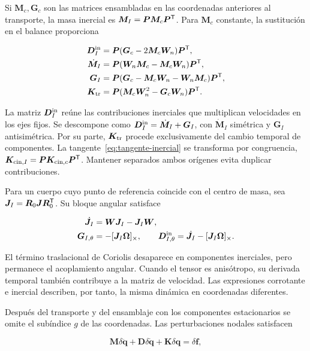 Si $\bm M_c,\bm G_c$ son las matrices ensambladas en las coordenadas anteriores al transporte, la masa inercial es $\bm M_I=\bm P\bm M_c\bm P^\mathsf T$. Para $\bm M_c$ constante, la sustitución en el balance proporciona

\begin{align}
\bm D_I^{\rm in}&=\bm P(\bm G_c-2\bm M_c\bm W_n)\bm P^\mathsf T,\nonumber\\
\dot{\bm M}_I&=\bm P(\bm W_n\bm M_c-\bm M_c\bm W_n)\bm P^\mathsf T,\nonumber\\
\bm G_I&=\bm P(\bm G_c-\bm M_c\bm W_n-\bm W_n\bm M_c)\bm P^\mathsf T,\label{eq:transportG}\\
\bm K_{\rm tr}&=\bm P(\bm M_c\bm W_n^2-\bm G_c\bm W_n)\bm P^\mathsf T.
\label{eq:transportK}
\end{align}

La matriz $\bm D_I^{\rm in}$ reúne las contribuciones inerciales que multiplican velocidades en los ejes fijos. Se descompone como $\bm D_I^{\rm in}=\dot{\bm M}_I+\bm G_I$, con $\dot{\bm M}_I$ simétrica y $\bm G_I$ antisimétrica. Por su parte, $\bm K_{\rm tr}$ procede exclusivamente del cambio temporal de componentes. La tangente~\eqref{eq:tangente-inercial} se transforma por congruencia, $\bm K_{{\rm cin},I}=\bm P\bm K_{{\rm cin},c}\bm P^\mathsf T$. Mantener separados ambos orígenes evita duplicar contribuciones.

Para un cuerpo cuyo punto de referencia coincide con el centro de masa, sea $\bm J_I=\bm R_0\bm J\bm R_0^\mathsf T$. Su bloque angular satisface

\begin{align}
\dot{\bm J}_I&=\bm W\bm J_I-\bm J_I\bm W,\nonumber\\
\bm G_{I,\theta}&=-[\bm J_I\bm\Omega]_\times,\qquad
\bm D_{I,\theta}^{\rm in}=\dot{\bm J}_I-[\bm J_I\bm\Omega]_\times.
\end{align}

El término traslacional de Coriolis desaparece en componentes inerciales, pero permanece el acoplamiento angular. Cuando el tensor es anisótropo, su derivada temporal también contribuye a la matriz de velocidad. Las expresiones corrotante e inercial describen, por tanto, la misma dinámica en coordenadas diferentes.

Después del transporte y del ensamblaje con los componentes estacionarios se omite el subíndice $g$ de las coordenadas. Las perturbaciones nodales satisfacen

\begin{equation}
\bm M\delta\ddot{\bm q}+\bm D\delta\dot{\bm q}
+\bm K\delta\bm q=\delta\bm f,
\label{eq:fullsystem}
\end{equation}

